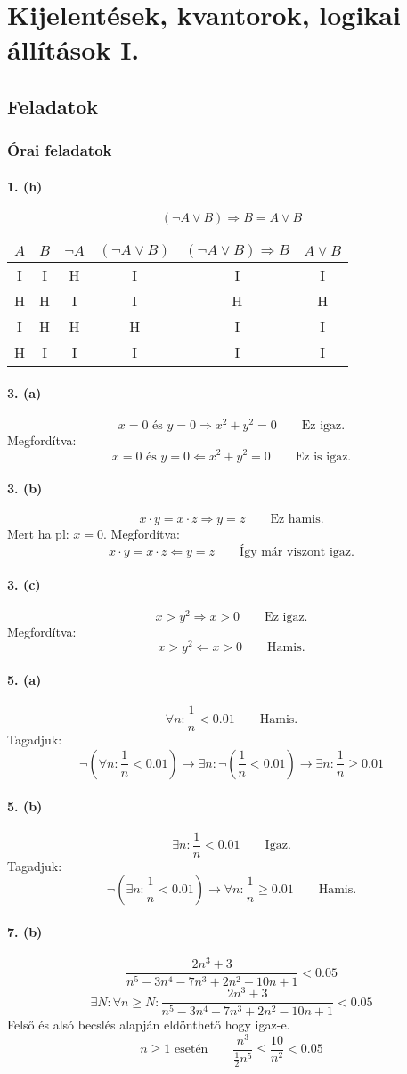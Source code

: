 \documentclass[12pt,a4paper,fleqn]{article}
\newcommand{\myparagraph}[1]{\paragraph{#1}\mbox{}}
\begin{document}
\clearpage
\section{Kijelentések, kvantorok, logikai állítások I.}
\setcounter{subsection}{1}
\subsection{Feladatok}
\subsubsection{Órai feladatok}


\myparagraph{1. (h)}
\[ (\neg A \lor B) \Rightarrow B = A \lor B \]
\begin{tabular}{c|c||c|c|c||c}
  $A$ & $B$ & $\neg A$ & $(\neg A \lor B)$ & $(\neg A \lor B) \Rightarrow B$
    & $A \lor B$ \\ \hline
  I & I & H & I & I & I \\ \hline
  H & H & I & I & H & H \\ \hline
  I & H & H & H & I & I \\ \hline
  H & I & I & I & I & I \\
\end{tabular}

\myparagraph{3. (a)}
\[ x = 0 \text{ és } y = 0 \Rightarrow x^2 + y^2 = 0 \qquad \text{Ez igaz.} \]
Megfordítva:
\[ x = 0 \text{ és } y = 0 \Leftarrow x^2 + y^2 = 0 \qquad \text{Ez is igaz.} \]

\myparagraph{3. (b)}
\[ x \cdot y = x \cdot z \Rightarrow y = z \qquad \text{Ez hamis.} \]
Mert ha pl: $x = 0$. Megfordítva:
\[ x \cdot y = x \cdot z \Leftarrow y = z \qquad \text{Így már viszont igaz.} \]

\myparagraph{3. (c)}
\[ x > y^2 \Rightarrow x > 0 \qquad \text{Ez igaz.} \]
Megfordítva:
\[ x > y^2 \Leftarrow x > 0 \qquad \text{Hamis.} \]

\myparagraph{5. (a)}
\[ \forall n : \frac{1}{n} < 0.01 \qquad \text{Hamis.} \]
Tagadjuk:
\[
  \neg(\forall n : \frac{1}{n} < 0.01)
  \rightarrow \exists n: \neg(\frac{1}{n} < 0.01)
  \rightarrow \exists n : \frac{1}{n} \geq 0.01
\]

\myparagraph{5. (b)}
\[ \exists n : \frac{1}{n} < 0.01 \qquad \text{Igaz.} \]
Tagadjuk:
\[ \neg (\exists n : \frac{1}{n} < 0.01) \rightarrow
  \forall n : \frac{1}{n} \geq 0.01 \qquad \text{Hamis.} \]

\myparagraph{7. (b)}
\[ \dfrac{2n^3+3}{n^5-3n^4-7n^3+2n^2-10n+1} < 0.05 \]
\[
  \exists N : \forall n \geq N : \dfrac{2n^3+3}{n^5-3n^4-7n^3+2n^2-10n+1} < 0.05
\]
Felső és alsó becslés alapján eldönthető hogy igaz-e.
\[ n \geq 1 \text{ esetén} \qquad \frac{n^3}{\frac{1}{2}n^5}
  \leq \frac{10}{n^2} < 0.05 \]
\end{document}
